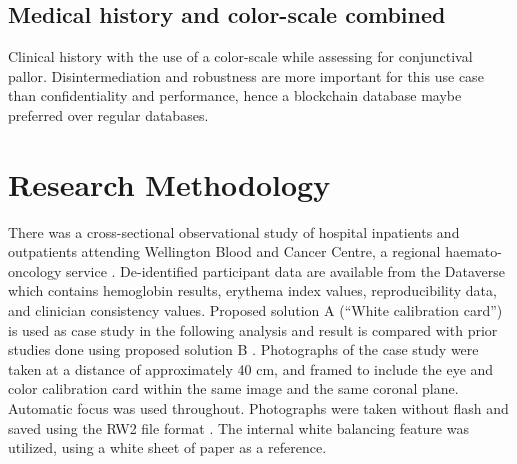 \documentclass[peerreview]{IEEEtran}
\begin{document}
\subsection{Medical history and color-scale combined}
Clinical history with the use of a color-scale while assessing for conjunctival pallor. Disintermediation and robustness
are more important for this use case than confidentiality and performance, hence a blockchain database maybe preferred over 
regular databases.

\section{Research Methodology}
% 

There was a cross-sectional observational study of hospital inpatients and outpatients attending Wellington Blood and 
Cancer Centre, a regional haemato-oncology service \cite{10.1371/journal.pone.0153286}. De-identified participant data are 
available from the Dataverse which contains hemoglobin results, erythema index values, reproducibility data, and clinician
consistency values\cite{L4MDKC_2015}. Proposed solution A (``White calibration card'')\cite{anggraeni2017non,10.1371/journal.pone.0153286} 
is used as case study in the following analysis and result is compared with prior studies done using proposed solution B 
\cite{chowdhury2002taking}. Photographs of the case study were taken at a distance of approximately 40 cm, and framed to 
include the eye and color calibration card within the same image and the same coronal plane. Automatic focus was used
throughout. Photographs were taken without flash and saved using the RW2 file format . The internal white balancing 
feature was utilized, using a white sheet of paper as a reference.
\end{document}
